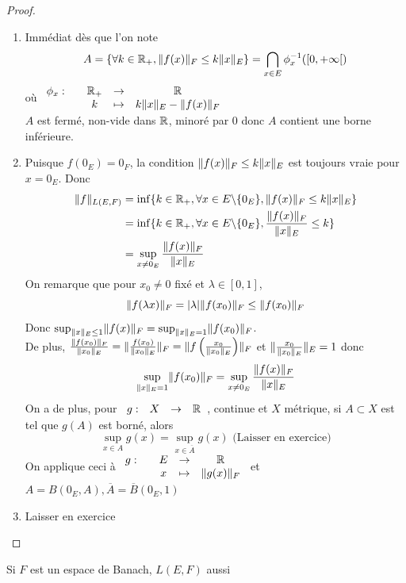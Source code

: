 \documentclass[]{report}
\begin{document}
    \begin{proof}
        \begin{enumerate}
            \item Immédiat dès que l'on note
            \[A=\{\forall k\in \mathbb{R}_+,\lVert f(x) \rVert_F\le k\lVert x \rVert_E\}=\bigcap_{x\in E} \phi_x^{-1}([0,+\infty[)\]
            où $\begin{array}{ccccc} \phi_x : & & \mathbb{R}_+ & \to & \mathbb{R} \\ & & k & \mapsto & k\lVert x \rVert_E -\lVert f(x) \rVert_F \end{array}$\\
            $A$ est fermé, non-vide dans $\mathbb{R}$, minoré par $0$ donc $A$ contient une borne inférieure.
            \item Puisque $f(0_E)=0_F$, la condition $\lVert f(x) \rVert_F\le k\lVert x \rVert_E$ est toujours vraie pour $x=0_E$. Donc
            \begin{align*}
                \lVert f \rVert_{L(E,F)}&=\inf \{k\in \mathbb{R}_+, \forall x\in E\backslash \{0_E\},\lVert f(x) \rVert_F\le k\lVert x \rVert_E\}\\
                &=\inf \{k\in \mathbb{R}_+,\forall x\in E\backslash \{0_E\},\frac{\lVert f(x) \rVert_F}{\lVert x \rVert_E}\le k\}\\
                &=\sup_{x\neq 0_E}\frac{\lVert f(x) \rVert_F}{\lVert x \rVert_E}
            \end{align*}
            On remarque que pour $x_0\neq 0$ fixé et $\lambda\in [0,1]$,
            \[\lVert f(\lambda x) \rVert_F=|\lambda|\lVert f(x_0) \rVert_F\le \lVert f(x_0) \rVert_F\]
            Donc $\sup_{\lVert x \rVert_E\le 1}\lVert f(x) \rVert_F=\sup_{\lVert x \rVert_E=1}\lVert f(x_0) \rVert_F$.\\
            De plus, $\frac{\lVert f(x_0) \rVert_F}{\lVert x_0 \rVert_E}=\lVert \frac{f(x_0)}{\lVert x_0 \rVert_E} \rVert_F=\lVert f\left( \frac{x_0}{\lVert x_0 \rVert_E}\right) \rVert_F$ et $\lVert \frac{x_0}{\lVert x_0 \rVert_E} \rVert_E=1$ donc
            \[\sup_{\lVert x \rVert_E=1}\lVert f(x_0) \rVert_F=\sup_{x\neq 0_E}\frac{\lVert f(x) \rVert_F}{\lVert x \rVert_E}\]
            On a de plus, pour $\begin{array}{ccccc} g : & X & \to & \mathbb{R} \end{array}$, continue et $X$ métrique, si $A\subset X$ est tel que $g(A)$ est borné, alors
            \[\sup_{x\in A}g(x)=\sup_{x\in \overline{A}}g(x)\text{ (Laisser en exercice)}\]
            On applique ceci à $\begin{array}{ccccc} g : & & E & \to & \mathbb{R} \\ & & x & \mapsto & \lVert g(x) \rVert_F \end{array}$ et $A=B(0_E,A),\overline{A}=\overline{B}(0_E,1)$
            \item Laisser en exercice
        \end{enumerate}
    \end{proof}

    \begin{tm}{}{}
        Si $F$ est un espace de Banach, $L(E,F)$ aussi
    \end{tm}
\end{document}
